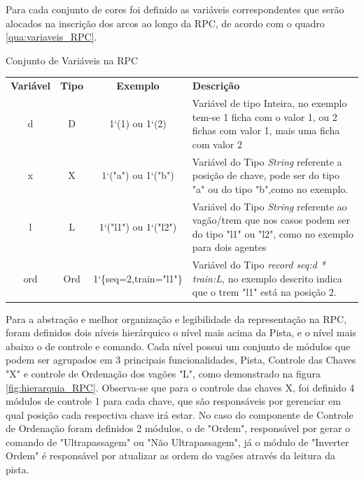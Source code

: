  Para cada conjunto de cores foi definido as variáveis correspondentes que serão alocados na inscrição dos arcos ao longo da RPC, de acordo com o quadro \ref{qua:variaveis_RPC}.

\begin{quadro}[ht]
\caption{Conjunto de Variáveis na RPC}
\begin{tabularx}{\textwidth}{|c|c|c|X|}
\cline{1-4}
\textbf{Variável} & \textbf{Tipo} & \textbf{Exemplo} & \textbf{Descrição} \\ 
\cline{1-4} %
d & D & 1`(1) ou 1`(2) & Variável de tipo Inteira, no exemplo tem-se 1 ficha com o valor 1, ou 2 fichas com valor 1, mais uma ficha com valor 2 \\ \cline{1-4} %
x & X & 1`("a") ou 1`("b") & Variável do Tipo \textit{String} referente a posição de chave, pode ser do tipo "a" ou do tipo "b",como no exemplo. \\ \cline{1-4} %
l & L & 1`("l1") ou 1`("l2") & Variável do Tipo \textit{String} referente ao vagão/trem que nos casos podem ser do tipo "l1" ou "l2", como no exemplo para dois agentes \\ \cline{1-4} %
ord & Ord & 1`\{seq=2,train="l1"\} & Variável do Tipo \textit{record seq:d * train:L}, no exemplo descrito indica que o trem "l1" está na posição 2. \\ \cline{1-4} 
\end{tabularx}
\label{qua:variaveis_RPC}
\end{quadro}

Para a abstração e melhor organização e legibilidade da representação na RPC, foram definidos dois níveis hierárquico o nível mais acima da Pista, e o nível mais abaixo o de controle e comando. Cada nível possui um conjunto de módulos que podem ser agrupados em 3 principais funcionalidades, Pista, Controle das Chaves "X" e controle de Ordenação dos vagões "L", como demonstrado na figura \ref{fig:hierarquia_RPC}. Observa-se que para o controle das chaves X, foi definido 4 módulos de controle 1 para cada chave, que são responsáveis por gerenciar em qual posição cada respectiva chave irá estar. No caso do componente de Controle de Ordenação foram definidos 2 módulos, o de "Ordem", responsável por gerar o comando de "Ultrapassagem" ou "Não Ultrapassagem", já o módulo de "Inverter Ordem" é responsável por atualizar as ordem do vagões através da leitura da pista.

